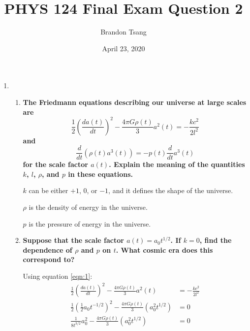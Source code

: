 \documentclass[11pt]{article}
\title{PHYS 124 Final Exam Question 2}
\author{Brandon Tsang}
\date{April 23, 2020}
\begin{document}
    \maketitle
    \begin{enumerate}[label=\textbf{\arabic*.}, start=2]
        \item{
            \begin{enumerate}[label=\textbf{(\alph*)}]
                \item{
                    \textbf{\boldmath The Friedmann equations describing our universe at large scales are
                    \begin{equation}
                        \label{eqn:1}
                        \frac{1}{2}\left(\frac{da(t)}{dt}\right)^2-\frac{4\pi G\rho(t)}{3}a^2(t)=-\frac{kc^2}{2l^2}
                    \end{equation}
                    and
                    \begin{equation}
                        \label{eqn:2}
                        \frac{d}{dt}(\rho(t)a^3(t))=-p(t)\frac{d}{dt}a^3(t)
                    \end{equation}
                    for the scale factor \(a(t)\). Explain the meaning of the quantities \(k\), \(l\), \(\rho\), and \(p\) in these equations.}
                    \par
                    \(k\) can be either \(+1\), \(0\), or \(-1\), and it defines the shape of the universe.
                    \par
                    \(\rho\) is the density of energy in the universe.
                    \par
                    \(p\) is the pressure of energy in the universe.
                }
                \item{
                    \textbf{\boldmath Suppose that the scale factor \(a(t)=a_0t^{1/2}\). If \(k=0\), find the dependence of \(\rho\) and \(p\) on \(t\). What cosmic era does this correspond to?}
                    \par
                    Using equation \ref{eqn:1}:
                    \begin{align*}
                        \frac{1}{2}\left(\frac{da(t)}{dt}\right)^2-\frac{4\pi G\rho(t)}{3}a^2(t)&=-\frac{kc^2}{2l^2} \\
                        \frac{1}{2}\left(\frac{1}{2}a_0t^{-1/2}\right)^2-\frac{4\pi G\rho(t)}{3}(a_0^2t^{1/2})&=0 \\
                        \frac{1}{8t^{3/2}}a_0^2-\frac{4\pi G\rho(t)}{3}(a_0^2t^{1/2})&=0 \\

\end{align*}}
\end{enumerate}}
\end{enumerate}
\end{document}
